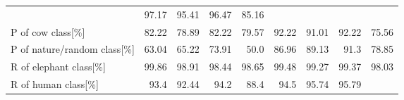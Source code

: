 \begin{table}[!htbp]
{\begin{tabular}{lrrrrrrrr}
                                        & \cellcolor{tbgreen}  97.17 
                                        & \cellcolor{tbyellow} 95.41 
                                        & \cellcolor{tbgreeny} 96.47
                                        & \cellcolor{tbred}    85.16 \\
        P of cow class[\%]              & \cellcolor{tbyellow} 82.22 
                                        & \cellcolor{tbyellow} 78.89 
                                        & \cellcolor{tbyellow} 82.22 
                                        & \cellcolor{tbyellow} 79.57 
                                        & \cellcolor{tbgreen}  92.22 
                                        & \cellcolor{tbgreeny} 91.01 
                                        & \cellcolor{tbgreen}  92.22 
                                        & \cellcolor{tbred}    75.56 \\
        P of nature/random class[\%]    & \cellcolor{tbyellow} 63.04 
                                        & \cellcolor{tbyellow} 65.22 
                                        & \cellcolor{tbyellow} 73.91 
                                        & \cellcolor{tbred}    50.0  
                                        & \cellcolor{tbgreeny} 86.96 
                                        & \cellcolor{tbgreeny} 89.13 
                                        & \cellcolor{tbgreen}  91.3 
                                        & \cellcolor{tbyellow} 78.85 \\\midrule
        R of elephant class[\%]         & \cellcolor{tbgreen}  99.86 
                                        & \cellcolor{tbyellow} 98.91 
                                        & \cellcolor{tbyellow} 98.44 
                                        & \cellcolor{tbyellow} 98.65 
                                        & \cellcolor{tbgreeny} 99.48 
                                        & \cellcolor{tbgreeny} 99.27 
                                        & \cellcolor{tbgreeny} 99.37 
                                        & \cellcolor{tbred}    98.03 \\
        R of human class[\%]            & \cellcolor{tbyellow} 93.4  
                                        & \cellcolor{tbyellow} 92.44 
                                        & \cellcolor{tbgreeny} 94.2  
                                        & \cellcolor{tbred}    88.4  
                                        & \cellcolor{tbgreeny} 94.5  
                                        & \cellcolor{tbgreen}  95.74 
                                        & \cellcolor{tbgreen}  95.79 

\end{tabular}}
\end{table}

